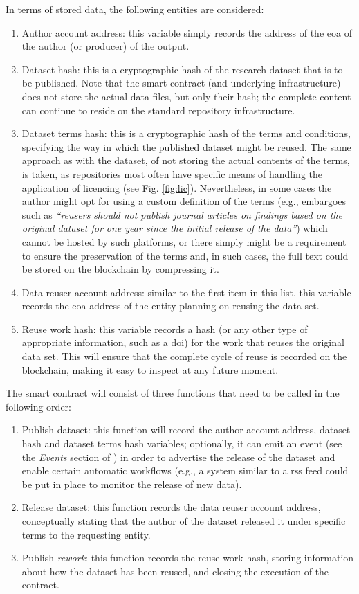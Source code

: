 In terms of stored data, the following entities are considered:
\begin{enumerate}
\item Author account address: this variable simply records the address of the \gls{eoa} of the author (or producer) of the output.
\item Dataset hash: this is a cryptographic hash of the research dataset that is to be published. Note that the smart
contract (and underlying infrastructure) does not store the actual data files, but only their hash; the complete content can continue to reside
on the standard repository infrastructure.
\item Dataset terms hash: this is a cryptographic hash of the terms and conditions, specifying the way in which
the published dataset might be reused. The same approach as with the dataset, of not storing the actual contents of the terms, is taken, as repositories most often have specific means of handling the application of licencing (see Fig. \ref{fig:lic}). Nevertheless, in some cases the author might opt for using a custom definition of the terms (e.g., embargoes such as \emph{``reusers should not publish journal articles on findings based on the original dataset for one year since the initial release of the data''}) which cannot be hosted by such platforms, or there simply might be a requirement to ensure the preservation of the terms and, in such cases, the full text could be stored on the blockchain by compressing it\cite{brown}.
\item Data reuser account address: similar to the first item in this list, this variable records the \gls{eoa} address of the entity planning on reusing the data set.
\item Reuse work hash: this variable records a hash (or any other type of appropriate information, such as a \gls{doi}) for the work that reuses the original data set. This will ensure that the complete cycle of reuse is recorded on the blockchain, making it easy to inspect at any future moment.
\end{enumerate}

The smart contract will consist of three functions that need to be called in the following order:
\begin{enumerate}
\item Publish dataset: this function will record the author account address, dataset hash and dataset terms hash variables; optionally, it can emit an event (see the \emph{Events} section of \cite{solidity}) in order to advertise the release of the dataset and enable certain automatic workflows (e.g., a system similar to a \gls{rss} feed could be put in place to monitor the release of new data).
\item Release dataset: this function records the data reuser account address, conceptually stating that the author of the dataset released it under specific terms to the requesting entity.
\item Publish \emph{rework}: this function records the reuse work hash, storing information about how the dataset has been reused, and closing the execution of the contract.
\end{enumerate}

